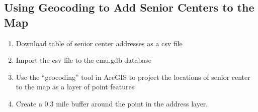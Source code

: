 \subsection{Using Geocoding to Add Senior Centers to the Map}
\begin{enumerate}
\item Download table of senior center addresses as a csv file
\item Import the csv file to the cmu.gdb database
\item Use the ``geocoding'' tool in ArcGIS to project the locations of
  senior center to the map as a layer of point features
\item Create a 0.3 mile buffer around the point in the address layer.
\end{enumerate}